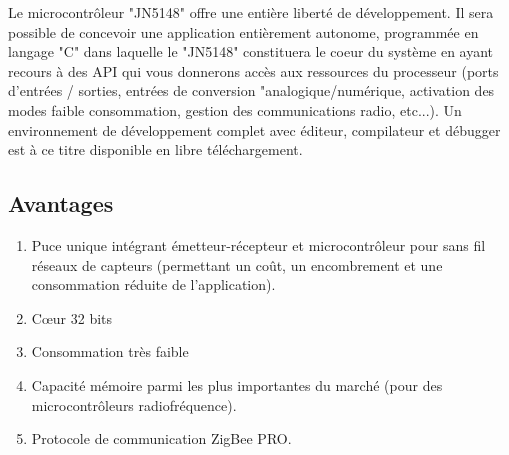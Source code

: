 \documentclass [a4paper] {report}
\begin{document}
Le microcontr\^oleur "JN5148" offre une entière libert\'e de d\'eveloppement. Il sera possible de concevoir une application entièrement autonome, programm\'ee en langage "C" dans laquelle le "JN5148" constituera le coeur du système en ayant recours à des API qui vous donnerons accès aux ressources du processeur (ports d'entr\'ees / sorties, entr\'ees de conversion "analogique/num\'erique, activation des modes faible consommation, gestion des communications radio, etc...). Un environnement de d\'eveloppement complet avec \'editeur, compilateur et d\'ebugger est à ce titre disponible en libre téléchargement.

\subsection{Avantages}  

\begin{enumerate}
	\item  Puce unique int\'egrant \'emetteur-r\'ecepteur et microcontr\^oleur pour sans fil r\'eseaux de capteurs (permettant un coût, un encombrement et une consommation r\'eduite de l’application).
	\item Cœur 32 bits
	\item Consommation très faible  
	\item Capacit\'e m\'emoire parmi les plus importantes du march\'e (pour des microcontr\^oleurs radiofr\'equence).
	\item Protocole de communication ZigBee PRO.
\end{enumerate}


\end{document}

